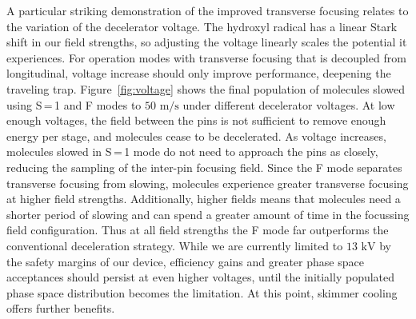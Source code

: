 \documentclass[%
 reprint,
 amsmath,amssymb,
 aps,
prl,
]{revtex4-1}
\begin{document}
A particular striking demonstration of the improved transverse focusing relates to the variation of the decelerator voltage. The hydroxyl radical has a linear Stark shift in our field strengths, so adjusting the voltage linearly scales the potential it experiences.
For operation modes with transverse focusing that is decoupled from longitudinal, voltage increase should only improve performance, deepening the traveling trap.
Figure~\ref{fig:voltage} shows the final population of molecules slowed using S\,=\,1 and F modes to $50 \text{ m/s}$ under different decelerator voltages.
At low enough voltages, the field between the pins is not sufficient to remove enough energy per stage, and molecules cease to be decelerated.
As voltage increases, molecules slowed in S\,=\,1 mode do not need to approach the pins as closely, reducing the sampling of the inter-pin focusing field.
Since the F mode separates transverse focusing from slowing, molecules experience greater transverse focusing at higher field strengths.
Additionally, higher fields means that molecules need a shorter period of slowing and can spend a greater amount of time in the focussing field configuration.
Thus at all field strengths the F mode far outperforms the conventional deceleration strategy.
While we are currently limited to $13 \text{ kV}$ by the safety margins of our device, efficiency gains and greater phase space acceptances should persist at even higher voltages, until the initially populated phase space distribution becomes the limitation.
At this point, skimmer cooling~\cite{Segev2017,Wu2018} offers further benefits.
\end{document}
